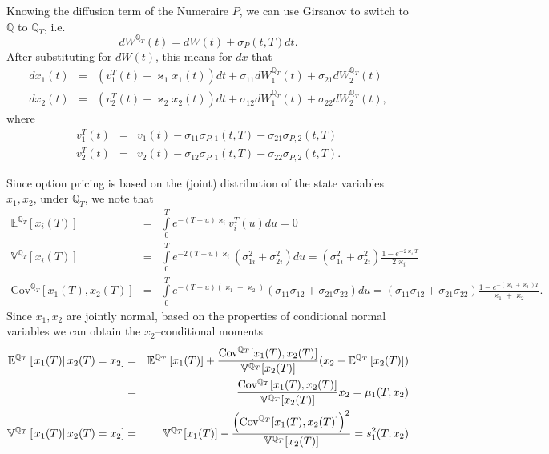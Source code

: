 \documentclass[11pt,a4paper]{article}
\numberwithin{equation}{section}
\begin{document}
Knowing the diffusion term of the Numeraire $P$, we can use Girsanov to switch to $\mathbb{Q}$ to $\mathbb{Q}_T$, i.e.
\begin{equation*}
  d{W^{{\mathbb{Q}_T}}}(t) = dW(t) + {\sigma _P}(t,T)dt.
\end{equation*}
After substituting for $dW(t)$, this means for $dx$ that
\begin{eqnarray*}
d{x_1}(t) &=& \left( {v_1^T(t) - {\varkappa_1}{x_1}(t)} \right)dt + {\sigma _{11}}dW_1^{{\mathbb{Q}_T}}(t) + {\sigma _{21}}dW_2^{{\mathbb{Q}_T}}(t)\\
d{x_2}(t) &=& \left( {v_2^T(t) - {\varkappa_2}{x_2}(t)} \right)dt + {\sigma _{12}}dW_1^{{\mathbb{Q}_T}}(t) + {\sigma _{22}}dW_2^{{\mathbb{Q}_T}}(t),
\end{eqnarray*}
where 
\begin{eqnarray*}
v_1^T(t) &=& {v_1}(t) - {\sigma _{11}}{\sigma _{P,1}}(t,T) - {\sigma _{21}}{\sigma _{P,2}}(t,T)\\
v_2^T(t) &=& {v_2}(t) - {\sigma _{12}}{\sigma _{P,1}}(t,T) - {\sigma _{22}}{\sigma _{P,2}}(t,T).
\end{eqnarray*}

Since option pricing is based on the (joint) distribution of the state variables $x_1, x_2$, under $\mathbb{Q}_T$, we note that 
\begin{eqnarray*}
{\mathbb{E}^{{\mathbb{Q}_T}}}[{x_i}(T)] &=& \int\limits_0^T {{e^{ - (T - u){\varkappa_i}}}v_i^T(u)du}  = 0\\
{\mathbb{V}^{{\mathbb{Q}_T}}}[{x_i}(T)] &=& \int\limits_0^T {{e^{ - 2(T - u){\varkappa_i}}}(\sigma _{1i}^2 + \sigma _{2i}^2)du}  = (\sigma _{1i}^2 + \sigma _{2i}^2)\frac{{1 - {e^{ - 2{\varkappa_i}T}}}}{{2{\varkappa_i}}}\\
\text{Cov}^{{\mathbb{Q}_T}}[{x_1}(T),{x_2}(T)] &=& \int\limits_0^T {{e^{ - (T - u)({\varkappa_1} + {\varkappa_2})}}({\sigma _{11}}{\sigma _{12}} + {\sigma _{21}}{\sigma _{22}})du}  = ({\sigma _{11}}{\sigma _{12}} + {\sigma _{21}}{\sigma _{22}})\frac{{1 - {e^{ - ({\varkappa_1} + {\varkappa_2})T}}}}{{{\varkappa_1} + {\varkappa_2}}}.
\end{eqnarray*}
Since $x_1, x_2$ are jointly normal, based on the properties of conditional normal variables we can obtain the $x_2$--conditional moments
\begin{eqnarray*}
  {\mathbb{E}^{{\mathbb{Q}_T}}}\left[ {\left. {{x_1}(T)} \right|{x_2}(T) = {x_2}} \right] &=& {\mathbb{E}^{{\mathbb{Q}_T}}}\left[ {{x_1}(T)} \right] + \frac{{\text{Cov}^{{\mathbb{Q}_T}}[{x_1}(T),{x_2}(T)]}}{{{\mathbb{V}^{{\mathbb{Q}_T}}}[{x_2}(T)]}}({x_2} - {\mathbb{E}^{{\mathbb{Q}_T}}}\left[ {{x_2}(T)} \right])\\
   &=& \frac{{{\rm{Co}}{{\rm{v}}^{{\mathbb{Q}_T}}}[{x_1}(T),{x_2}(T)]}}{{{\mathbb{V}^{{\mathbb{Q}_T}}}[{x_2}(T)]}}{x_2} = {\mu _1}(T,{x_2})\\
   {\mathbb{V}^{{\mathbb{Q}_T}}}\left[ {\left. {{x_1}(T)} \right|{x_2}(T) = {x_2}} \right] &=& {\mathbb{V}^{{\mathbb{Q}_T}}}[{x_1}(T)] - \frac{{{{\left( {\text{Cov}^{{\mathbb{Q}_T}}[{x_1}(T),{x_2}(T)]} \right)}^2}}}{{{\mathbb{V}^{{\mathbb{Q}_T}}}[{x_2}(T)]}} = s_1^2(T,{x_2})
\end{eqnarray*}
\end{document}
